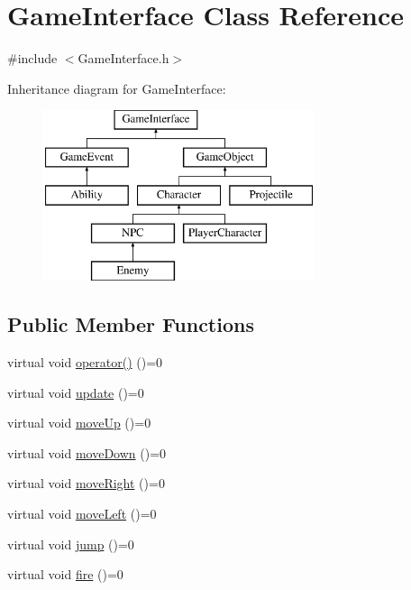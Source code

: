 \hypertarget{class_game_interface}{\section{Game\-Interface Class Reference}
\label{class_game_interface}
}


{\ttfamily \#include $<$Game\-Interface.\-h$>$}

Inheritance diagram for Game\-Interface\-:\begin{figure}[H]
\begin{center}
\leavevmode
\includegraphics[height=5.000000cm]{class_game_interface}
\end{center}
\end{figure}
\subsection*{Public Member Functions}
\begin{DoxyCompactItemize}
\item 
virtual void \hyperlink{class_game_interface_aa47ddf1a598f94dc6273e5d06834f435}{operator()} ()=0
\item 
virtual void \hyperlink{class_game_interface_aac4337d6b69549d389ff7d1b167fd7be}{update} ()=0
\item 
virtual void \hyperlink{class_game_interface_ac451407fef525c7114bbd3a2e3d17799}{move\-Up} ()=0
\item 
virtual void \hyperlink{class_game_interface_a6899c1e5b3f48ed7892791e540a4c55c}{move\-Down} ()=0
\item 
virtual void \hyperlink{class_game_interface_a4eb03058ca25e4b741f4203e5a2f44b8}{move\-Right} ()=0
\item 
virtual void \hyperlink{class_game_interface_a66cbd9c9e07a5abca69879431346e1ea}{move\-Left} ()=0
\item 
virtual void \hyperlink{class_game_interface_a7dc8aef4e9339745250c77e8b41ee1b2}{jump} ()=0
\item 
virtual void \hyperlink{class_game_interface_af3f525cdb14ebc3c6b139780c1d5f318}{fire} ()=0
\end{DoxyCompactItemize}


